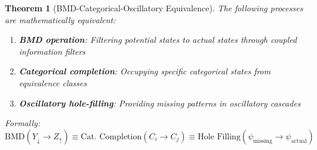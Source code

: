 \documentclass[12pt,a4paper]{article}
\newtheorem{theorem}{Theorem}
\begin{document}
\begin{theorem}[BMD-Categorical-Oscillatory Equivalence]
\label{thm:triple_equivalence}
The following processes are mathematically equivalent:
\begin{enumerate}
\item \textbf{BMD operation}: Filtering potential states to actual states through coupled information filters
\item \textbf{Categorical completion}: Occupying specific categorical states from equivalence classes  
\item \textbf{Oscillatory hole-filling}: Providing missing patterns in oscillatory cascades
\end{enumerate}

Formally:
\begin{equation}
\text{BMD}(Y_{\downarrow} \to Z_{\uparrow}) \equiv \text{Cat. Completion}(C_i \to C_j) \equiv \text{Hole Filling}(\psi_{\text{missing}} \to \psi_{\text{actual}})
\end{equation}
\end{theorem}
\end{document}
